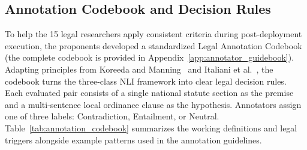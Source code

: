     \subsection{Annotation Codebook and Decision Rules}
    \label{sec:annotation_codebook}
    To help the 15 legal researchers apply consistent criteria during post-deployment execution, the proponents developed a standardized Legal Annotation Codebook (the complete codebook is provided in Appendix~\ref{app:annotator_guidebook}). Adapting principles from Koreeda and Manning~\cite{koreeda2021contract} and Italiani et al.~\cite{italiani2026clash}, the codebook turns the three-class NLI framework into clear legal decision rules. Each evaluated pair consists of a single national statute section as the premise and a multi-sentence local ordinance clause as the hypothesis. Annotators assign one of three labels: Contradiction, Entailment, or Neutral. Table~\ref{tab:annotation_codebook} summarizes the working definitions and legal triggers alongside example patterns used in the annotation guidelines.

